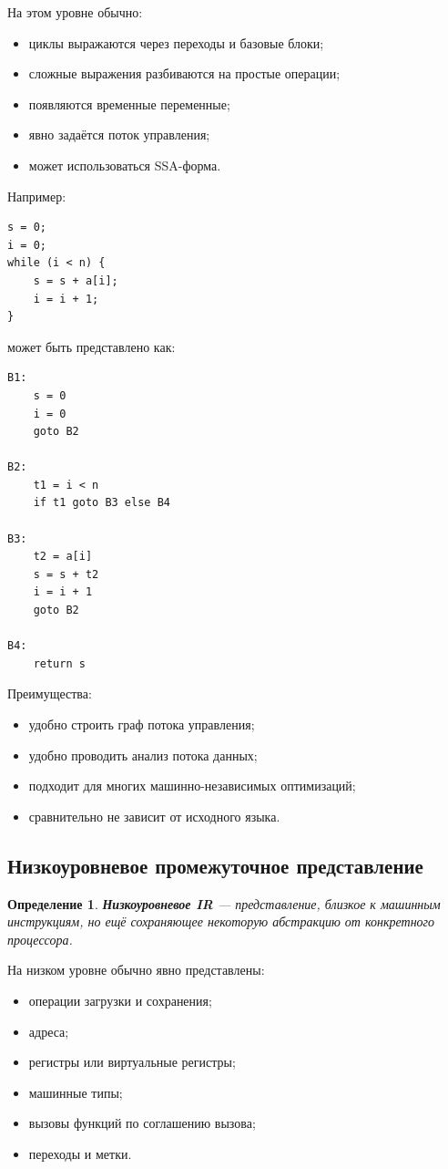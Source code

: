 \documentclass[12pt,a4paper]{article}
\newtheorem{definition}{Определение}
\begin{document}
На этом уровне обычно:
\begin{itemize}
    \item циклы выражаются через переходы и базовые блоки;
    \item сложные выражения разбиваются на простые операции;
    \item появляются временные переменные;
    \item явно задаётся поток управления;
    \item может использоваться SSA-форма.
\end{itemize}

Например:

\begin{lstlisting}
s = 0;
i = 0;
while (i < n) {
    s = s + a[i];
    i = i + 1;
}
\end{lstlisting}

может быть представлено как:

\begin{lstlisting}
B1:
    s = 0
    i = 0
    goto B2

B2:
    t1 = i < n
    if t1 goto B3 else B4

B3:
    t2 = a[i]
    s = s + t2
    i = i + 1
    goto B2

B4:
    return s
\end{lstlisting}

Преимущества:
\begin{itemize}
    \item удобно строить граф потока управления;
    \item удобно проводить анализ потока данных;
    \item подходит для многих машинно-независимых оптимизаций;
    \item сравнительно не зависит от исходного языка.
\end{itemize}

\subsection{Низкоуровневое промежуточное представление}

\begin{definition}
\textbf{Низкоуровневое IR} --- представление, близкое к машинным инструкциям, но ещё сохраняющее некоторую абстракцию от конкретного процессора.
\end{definition}

На низком уровне обычно явно представлены:
\begin{itemize}
    \item операции загрузки и сохранения;
    \item адреса;
    \item регистры или виртуальные регистры;
    \item машинные типы;
    \item вызовы функций по соглашению вызова;
    \item переходы и метки.
\end{itemize}
\end{document}
